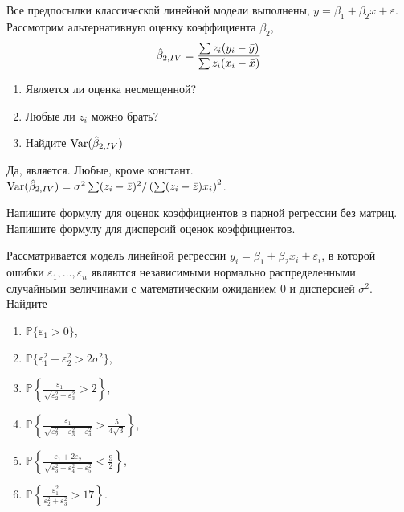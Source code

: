 \documentclass[pdftex,11pt,openany]{book}\usepackage[]{graphicx}\usepackage[]{color}
\begin{document}
\begin{problem}
Все предпосылки классической линейной модели выполнены, $y=\beta_1+\beta_2 x+\varepsilon$. Рассмотрим альтернативную оценку коэффициента $\beta_2$,
\begin{equation}
\hat{\beta}_{2,IV}=\frac{\sum z_i(y_i-\bar{y})}{\sum z_i(x_i-\bar{x})}
\end{equation}
\begin{enumerate}
\item Является ли оценка несмещенной?
\item Любые ли $z_i$ можно брать?
\item Найдите $\operatorname{Var}(\hat{\beta}_{2,IV})$
\end{enumerate}
\end{problem}

\begin{solution}
Да, является. Любые, кроме констант. $\operatorname{Var}(\hat{\beta}_{2,IV})=\sigma^2 \sum (z_i-\bar{z})^2/ \left(\sum (z_i-\bar{z})x_i \right)^2 $.
\end{solution}

\begin{problem}
Напишите формулу для оценок коэффициентов в парной регрессии без матриц. Напишите формулу для дисперсий оценок коэффициентов.
\end{problem}

\begin{solution}
\end{solution}


\begin{problem}
Рассматривается модель линейной регрессии $y_i = \beta_1 + \beta_2x_i + \varepsilon_i$, в которой ошибки $\varepsilon_1, \ldots, \varepsilon_n$ являются независимыми нормально распределенными случайными величинами с математическим ожиданием $0$ и дисперсией $\sigma^2$. Найдите

\begin{enumerate}
  \item $\mathbb{P}\{\varepsilon_1 > 0\}$, 
  \item $\mathbb{P}\{\varepsilon_1^2 + \varepsilon_2^2 > 2\sigma^2\}$,
  \item $\mathbb{P}\left\{\frac{\varepsilon_1}{\sqrt{\varepsilon_2^2 + \varepsilon_3^2}} > 2 \right\}$,	
  \item $\mathbb{P}\left\{\frac{\varepsilon_1}{\sqrt{\varepsilon_2^2 + \varepsilon_3^2 + \varepsilon_4^2}} > \frac{5}{4\sqrt{3}} \right\}$,
  \item $\mathbb{P}\left\{\frac{\varepsilon_1 + 2\varepsilon_2}{\sqrt{\varepsilon_3^2 + \varepsilon_4^2 + \varepsilon_5^2}} < \frac{9}{2} \right\}$,
  \item $\mathbb{P}\left\{\frac{\varepsilon_1^2}{\varepsilon_2^2 + \varepsilon_3^2} > 17 \right\}$.
\end{enumerate}
\end{problem}
\end{document}
